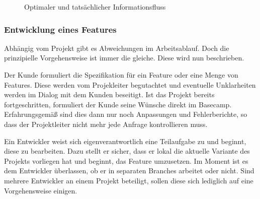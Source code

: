 \begin{figure}
	\centering
	
	\caption{ Optimaler und  tatsächlicher Informationsfluss}
	\label{fig:personen_beziehungen}
\end{figure}


\subsubsection{Entwicklung eines Features} %
\label{ssub:entwicklung_eines_features}

Abhängig vom Projekt gibt es Abweichungen im Arbeitsablauf. Doch die prinzipielle Vorgehensweise ist immer die gleiche. Diese wird nun beschrieben.

Der Kunde formuliert die Spezifikation für ein Feature oder eine Menge von Features. Diese werden vom Projekleiter begutachtet und eventuelle Unklarheiten werden im Dialog mit dem Kunden beseitigt. Ist das Projekt bereits fortgeschritten, formuliert der Kunde seine Wünsche direkt im Basecamp. Erfahrungsgemäß sind dies dann nur noch Anpassungen und Fehlerberichte, so dass der Projektleiter nicht mehr jede Anfrage kontrollieren muss.

Ein Entwickler weist sich eigenverantwortlich eine Teilaufgabe zu und beginnt, diese zu bearbeiten. Dazu stellt er sicher, dass er lokal die aktuelle Variante des Projekts vorliegen hat und beginnt, das Feature umzusetzen. Im Moment ist es dem Entwickler überlassen, ob er in separaten Branches arbeitet oder nicht. Sind mehrere Entwickler an einem Projekt beteiligt, sollen diese sich lediglich auf eine Vorgehensweise einigen.

